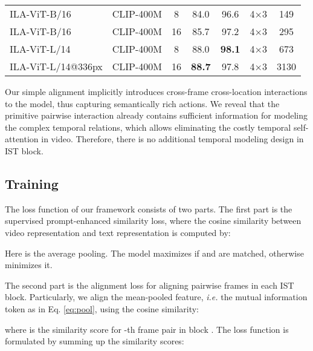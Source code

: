 \documentclass[10pt,twocolumn,letterpaper]{article}
\begin{document}
\begin{table*}[t!]
\begin{center}
{\begin{tabular}{lcccccc}
ILA-ViT-B/16                                    & CLIP-400M & 8      & 84.0          & 96.6          & 4×3   & 149      \\
ILA-ViT-B/16                                    & CLIP-400M & 16     & 85.7          & 97.2          & 4×3   & 295      \\
ILA-ViT-L/14                                    & CLIP-400M & 8      & 88.0          & \textbf{98.1} & 4×3   & 673      \\
ILA-ViT-L/14@336px                              & CLIP-400M & 16     & \textbf{88.7} & 97.8          & 4×3   & 3130     \\ \bottomrule
\end{tabular}
}
\end{center}
\label{table:1}
\vspace{-0.2in}
\end{table*}



Our simple alignment implicitly introduces cross-frame cross-location interactions to the model, thus capturing semantically rich actions.
We reveal that the primitive pairwise interaction already contains sufficient information for modeling the complex temporal relations, which allows eliminating the costly temporal self-attention in video.
Therefore, there is no additional temporal modeling design in IST block.




\subsection{Training}
\label{sec:train}

The loss function of our framework consists of two parts.
The first part is the supervised prompt-enhanced similarity loss, where the cosine similarity between video representation  and text representation  is computed by:

Here  is the average pooling.
The model maximizes  if  and  are matched, otherwise minimizes it.





The second part is the alignment loss for aligning pairwise frames in each IST block.
Particularly, we align the mean-pooled feature, \emph{i.e.} the mutual information token  as in Eq. \eqref{eq:pool}, using the cosine similarity:

where  is the similarity score for -th frame pair in block .
The loss function  is formulated by summing up the similarity scores:
\end{document}

